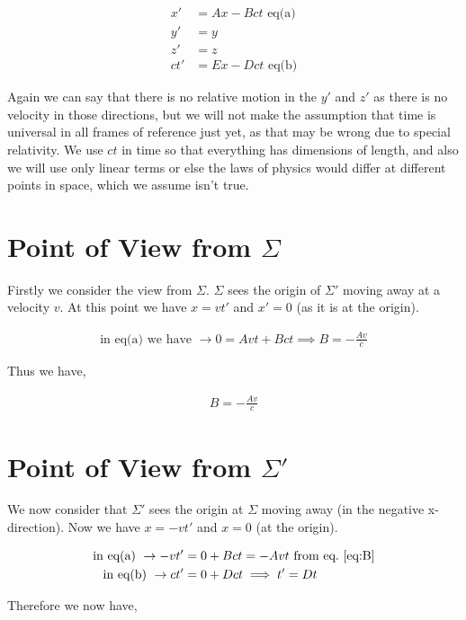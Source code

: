 \documentclass[11pt]{amsart}
\begin{document}
\begin{align*}
x' &= Ax - Bct \text{  eq(a)} \\
y' &= y \\
z' &= z \\
ct' &= Ex - Dct \text{  eq(b)}
\end{align*}

Again we can say that there is no relative motion in the $y'$ and $z'$ as there is no velocity in those directions, but we will not make the assumption that time is universal in all frames of reference just yet, as that may be wrong due to special relativity. We use $ct$ in time so that everything has dimensions of length, and also we will use only linear terms or else the laws of physics would differ at different points in space, which we assume isn't true.

\section{Point of View from $\Sigma$}

Firstly we consider the view from $\Sigma$. $\Sigma$ sees the origin of $\Sigma'$ moving away at a velocity $v$. At this point we have $x = vt'$ and $x' = 0$ (as it is at the origin).

\begin{align*}
\text{in eq(a) we have  } \to 0 = Avt + Bct \implies B = -\frac{Av}{c}
\end{align*}

Thus we have,

\begin{align}
\label{eq:B}
B = -\frac{Av}{c}
\end{align}

\section{Point of View from $\Sigma'$}

We now consider that $\Sigma'$ sees the origin at $\Sigma$ moving away (in the negative x-direction). Now we have $x = -vt'$ and $x = 0$ (at the origin).

\begin{align*}
\text{in eq(a)  } \to -vt' &= 0 + Bct = -Avt \text{  from eq.~\ref{eq:B}} \\
\text{in eq(b)  } \to ct' &= 0 + Dct \implies t' = Dt \\
\end{align*}

Therefore we now have,
\end{document}
